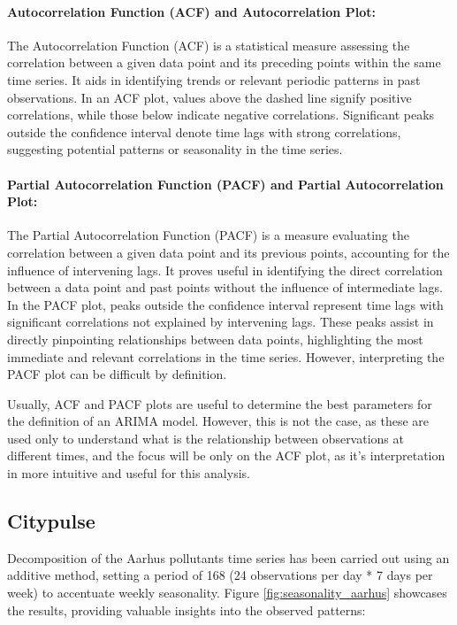 \paragraph{Autocorrelation Function (ACF) and Autocorrelation Plot:}The Autocorrelation Function (ACF) is a statistical measure assessing the correlation between a given data point and its preceding points within the same time series. It aids in identifying trends or relevant periodic patterns in past observations. In an ACF plot, values above the dashed line signify positive correlations, while those below indicate negative correlations. Significant peaks outside the confidence interval denote time lags with strong correlations, suggesting potential patterns or seasonality in the time series.

\paragraph{Partial Autocorrelation Function (PACF) and Partial Autocorrelation Plot:}The Partial Autocorrelation Function (PACF) is a measure evaluating the correlation between a given data point and its previous points, accounting for the influence of intervening lags. It proves useful in identifying the direct correlation between a data point and past points without the influence of intermediate lags. In the PACF plot, peaks outside the confidence interval represent time lags with significant correlations not explained by intervening lags. These peaks assist in directly pinpointing relationships between data points, highlighting the most immediate and relevant correlations in the time series. However, interpreting the PACF plot can be difficult by definition.

Usually, ACF and PACF plots are useful to determine the best parameters for the definition of an ARIMA model. However, this is not the case, as these are used only to understand what is the relationship between observations at different times, and the focus will be only on the ACF plot, as it's interpretation in more intuitive and useful for this analysis.

\subsection{Citypulse}
Decomposition of the Aarhus pollutants time series has been carried out using an additive method, setting a period of 168 (24 observations per day * 7 days per week) to accentuate weekly seasonality. Figure \ref{fig:seasonality_aarhus} showcases the results, providing valuable insights into the observed patterns:

